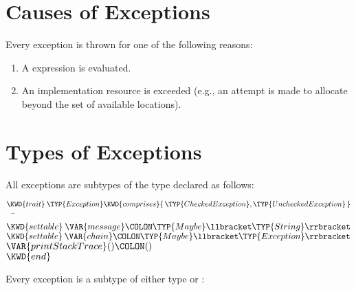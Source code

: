 \section{Causes of Exceptions}

Every exception is thrown for one of the following reasons:
\begin{enumerate}
\item A  expression is evaluated.
\item An implementation resource is exceeded (e.g., an attempt is made to
  allocate beyond the set of available locations).
\end{enumerate}


\section{Types of Exceptions}

All exceptions are subtypes of the type  declared as follows:
\begin{Fortress}
\(\KWD{trait}\:\TYP{Exception} \KWD{comprises} \{\,\TYP{CheckedException}, \TYP{UncheckedException}\,\}\)\\
{\tt~~}\pushtabs\=\+\(  \KWD{settable}\:\VAR{message}\COLON \TYP{Maybe}\llbracket\TYP{String}\rrbracket\)\\
\(  \KWD{settable}\:\VAR{chain}\COLON \TYP{Maybe}\llbracket\TYP{Exception}\rrbracket\)\\
\(  \VAR{printStackTrace}()\COLON ()\)\-\\\poptabs
\(\KWD{end}\)
\end{Fortress}
Every exception is a subtype of either type
 or :


